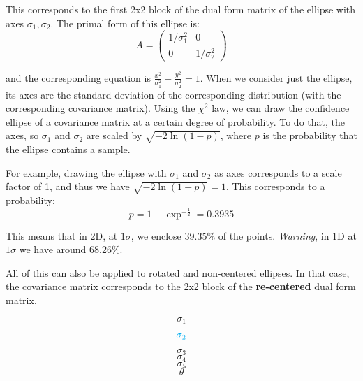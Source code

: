 This corresponds to the first 2x2 block of the dual form matrix of the ellipse with axes $\sigma_1, \sigma_2$.
The primal form of this ellipse is:
\begin{equation}
    A = \left(\begin{array}{cc}
        1/\sigma_1^2 & 0 \\
        0 & 1/\sigma_2^2
    \end{array}\right)
\end{equation}

and the corresponding equation is $\frac{x^2}{\sigma_1^2}+\frac{y^2}{\sigma_2^2} = 1$. When we consider just the ellipse, its axes are the standard deviation of the corresponding distribution (with the corresponding covariance matrix).
Using the $\chi^2$ law, we can draw the confidence ellipse of a covariance matrix at a certain degree of probability.
To do that, the axes, so $\sigma_1$ and $\sigma_2$ are scaled by $\sqrt{-2\ln{(1-p)}}$, where $p$ is the probability that the ellipse contains a sample.


For example, drawing the ellipse with $\sigma_1$ and $\sigma_2$ as axes corresponds to a scale factor of 1, and thus we have $\sqrt{-2\ln{(1-p)}} = 1$.
This corresponds to a probability:
\begin{equation}
    p = 1-\exp^{-\frac{1}{2}} = 0.3935
\end{equation}

This means that in 2D, at $1 \sigma$, we enclose 39.35\% of the points. \textit{Warning}, in 1D at $1 \sigma$ we have around 68.26\%.

All of this can also be applied to rotated and non-centered ellipses. In that case, the covariance matrix corresponds to the 2x2 block of the \textbf{re-centered} dual form matrix.





\newpage
\begin{equation}
    \sigma_1
\end{equation}
\begin{equation}
    \color{cyan}  \sigma_2
\end{equation}
\begin{equation}
    \sigma_3
\end{equation}
\begin{equation}
    \sigma_4
\end{equation}
\begin{equation}
    \sigma_5
\end{equation}
\begin{equation}
    \theta
\end{equation}

